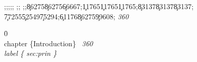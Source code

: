 {\ansi{}
{;;;;;
;;}
{\*\expandedcolortbl;;\cssrgb\c86275\c86275\c66667;\cssrgb\c11765\c11765\c11765;\cssrgb\c83137\c83137\c83137;
\cssrgb\c77255\c52549\c75294;\cssrgb\c61176\c86275\c99608;}
\pard{}\sl360

\f0   
  \\chapter{}  \{Introduction\} \
\pard{}\sl360
   \\label{}  \{  sec:prin  \} \
}